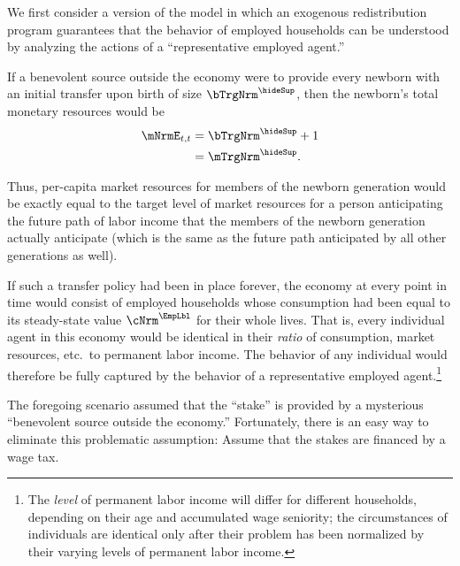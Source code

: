 \documentclass{econark}
\begin{document}
We first consider a version of the model in which an exogenous
redistribution program guarantees that the behavior of employed households can 
be understood by analyzing the actions of a ``representative employed agent.''  

If a benevolent source outside the economy were to provide every newborn with an initial
transfer upon birth of size $\bTrgNrm^{\hideSup}$, then the newborn's total monetary resources 
would be
\begin{equation}\begin{gathered}\begin{aligned}
  \mNrmE_{t,t} & =  \bTrgNrm^{\hideSup} + 1
\\ & =  \mTrgNrm^{\hideSup} 
.
\end{aligned}\end{gathered}\end{equation}

Thus, per-capita market resources for members of the newborn generation
would be exactly equal to the target level of market resources for a
person anticipating the future path of labor income that the members of the newborn
generation actually anticipate (which is the same as the future path
anticipated by all other generations as well).

If such a transfer policy had been in place forever, the economy at every 
point in time would consist of employed households whose consumption had 
been equal to its steady-state value ${\cNrm}^{\EmpLbl}$ for their whole lives.  That is, every 
individual agent in this economy would be identical in their {\it ratio} of consumption,
market resources, etc.\ to permanent labor income.  
The behavior of any individual would therefore be fully captured by the behavior
of a representative employed agent.\footnote{The {\it level} of permanent 
labor income will differ for different households, depending on their age
and accumulated wage seniority; the circumstances of individuals are identical
only after their problem has been normalized by their varying levels of permanent 
labor income.}

The foregoing scenario assumed that the ``stake'' is provided by a mysterious
``benevolent source outside the economy.''  Fortunately, there is an
easy way to eliminate this problematic assumption: Assume that the
stakes are financed by a wage tax.
\end{document}
